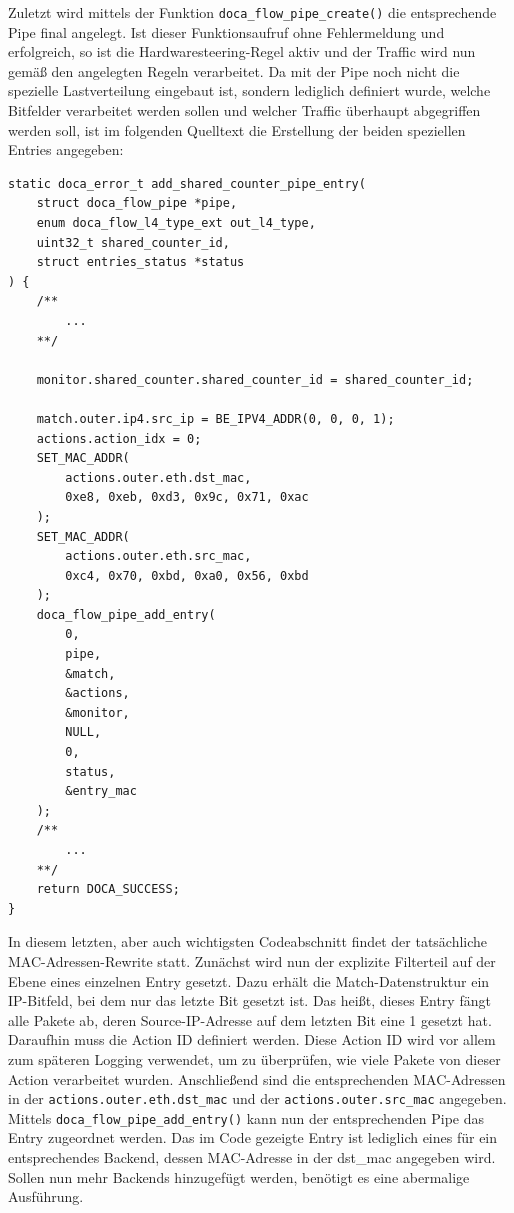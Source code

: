 Zuletzt wird mittels der Funktion \texttt{doca\_flow\_pipe\_create()} die entsprechende Pipe final angelegt. Ist dieser Funktionsaufruf ohne Fehlermeldung und erfolgreich, so ist die Hardwaresteering-Regel aktiv und der Traffic wird nun gemäß den angelegten Regeln verarbeitet.
\newline Da mit der Pipe noch nicht die spezielle Lastverteilung eingebaut ist, sondern lediglich definiert wurde, welche Bitfelder verarbeitet werden sollen und welcher Traffic überhaupt abgegriffen werden soll, ist im folgenden Quelltext die Erstellung der beiden speziellen Entries angegeben:
\begin{verbatim}
static doca_error_t add_shared_counter_pipe_entry(
    struct doca_flow_pipe *pipe,
    enum doca_flow_l4_type_ext out_l4_type,
    uint32_t shared_counter_id,
    struct entries_status *status
) {
    /**
        ...
    **/
    
    monitor.shared_counter.shared_counter_id = shared_counter_id;
    
    match.outer.ip4.src_ip = BE_IPV4_ADDR(0, 0, 0, 1);	
    actions.action_idx = 0;
    SET_MAC_ADDR(
        actions.outer.eth.dst_mac, 
        0xe8, 0xeb, 0xd3, 0x9c, 0x71, 0xac
    );
    SET_MAC_ADDR(
        actions.outer.eth.src_mac, 
        0xc4, 0x70, 0xbd, 0xa0, 0x56, 0xbd
    );
    doca_flow_pipe_add_entry(
        0, 
        pipe, 
        &match, 
        &actions, 
        &monitor, 
        NULL, 
        0, 
        status, 
        &entry_mac
    );
    /**
        ...
    **/
    return DOCA_SUCCESS;
}
\end{verbatim}
In diesem letzten, aber auch wichtigsten Codeabschnitt findet der tatsächliche MAC-Adressen-Rewrite statt. Zunächst wird nun der explizite Filterteil auf der Ebene eines einzelnen Entry gesetzt. Dazu erhält die Match-Datenstruktur ein IP-Bitfeld, bei dem nur das letzte Bit gesetzt ist. Das heißt, dieses Entry fängt alle Pakete ab, deren Source-IP-Adresse auf dem letzten Bit eine 1 gesetzt hat. Daraufhin muss die Action ID definiert werden. Diese Action ID wird vor allem zum späteren Logging verwendet, um zu überprüfen, wie viele Pakete von dieser Action verarbeitet wurden. Anschließend sind die entsprechenden MAC-Adressen in der \texttt{actions.outer.eth.dst\_mac} und der \texttt{actions.outer.src\_mac} angegeben.
Mittels \texttt{doca\_flow\_pipe\_add\_entry()} kann nun der entsprechenden Pipe das Entry zugeordnet werden. Das im Code gezeigte Entry ist lediglich eines für ein entsprechendes Backend, dessen MAC-Adresse in der dst\_mac angegeben wird. Sollen nun mehr Backends hinzugefügt werden, benötigt es eine abermalige Ausführung. 
